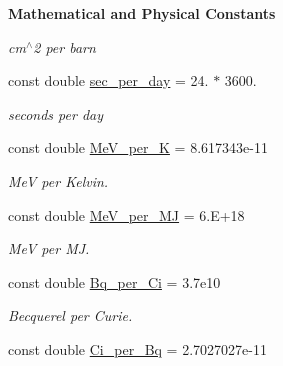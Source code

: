 \begin{Indent}{\bf Mathematical and Physical Constants}
\begin{DoxyCompactItemize}
\begin{DoxyCompactList}\small\item\em cm$^\wedge$2 per barn \end{DoxyCompactList}\item 
const double \hyperlink{namespacepyne_a3a54f183e7323b4d62c12f309c3af081}{sec\+\_\+per\+\_\+day} = 24. $\ast$ 3600.\hypertarget{namespacepyne_a3a54f183e7323b4d62c12f309c3af081}{}\label{namespacepyne_a3a54f183e7323b4d62c12f309c3af081}

\begin{DoxyCompactList}\small\item\em seconds per day \end{DoxyCompactList}\item 
const double \hyperlink{namespacepyne_af4fb3aac22e7bda0ece3bcf515151611}{Me\+V\+\_\+per\+\_\+K} = 8.\+617343e-\/11\hypertarget{namespacepyne_af4fb3aac22e7bda0ece3bcf515151611}{}\label{namespacepyne_af4fb3aac22e7bda0ece3bcf515151611}

\begin{DoxyCompactList}\small\item\em MeV per Kelvin. \end{DoxyCompactList}\item 
const double \hyperlink{namespacepyne_a911408381cffba2ad9a97fb5f9f6db79}{Me\+V\+\_\+per\+\_\+\+MJ} = 6.\+E+18\hypertarget{namespacepyne_a911408381cffba2ad9a97fb5f9f6db79}{}\label{namespacepyne_a911408381cffba2ad9a97fb5f9f6db79}

\begin{DoxyCompactList}\small\item\em MeV per MJ. \end{DoxyCompactList}\item 
const double \hyperlink{namespacepyne_a3fe0af70afecb7086dd59a5d3d5abd43}{Bq\+\_\+per\+\_\+\+Ci} = 3.\+7e10\hypertarget{namespacepyne_a3fe0af70afecb7086dd59a5d3d5abd43}{}\label{namespacepyne_a3fe0af70afecb7086dd59a5d3d5abd43}

\begin{DoxyCompactList}\small\item\em Becquerel per Curie. \end{DoxyCompactList}\item 
const double \hyperlink{namespacepyne_af67330218cc9e0d1b6fd2d8eca3f8cf8}{Ci\+\_\+per\+\_\+\+Bq} = 2.\+7027027e-\/11
\end{DoxyCompactItemize}
\end{Indent}
